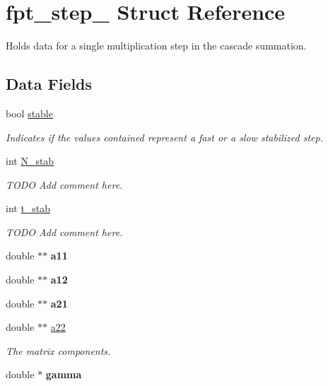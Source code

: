 \hypertarget{structfpt__step__}{
\section{fpt\_\-step\_\- Struct Reference}
\label{structfpt__step__}
}
Holds data for a single multiplication step in the cascade summation.  


\subsection*{Data Fields}
\begin{CompactItemize}
\item 
\hypertarget{structfpt__step___o0}{
bool \hyperlink{structfpt__step___o0}{stable}}
\label{structfpt__step___o0}

\begin{CompactList}\small\item\em Indicates if the values contained represent a fast or a slow stabilized step. \item\end{CompactList}\item 
\hypertarget{structfpt__step___o1}{
int \hyperlink{structfpt__step___o1}{N\_\-stab}}
\label{structfpt__step___o1}

\begin{CompactList}\small\item\em TODO Add comment here. \item\end{CompactList}\item 
\hypertarget{structfpt__step___o2}{
int \hyperlink{structfpt__step___o2}{t\_\-stab}}
\label{structfpt__step___o2}

\begin{CompactList}\small\item\em TODO Add comment here. \item\end{CompactList}\item 
\hypertarget{structfpt__step___o3}{
double $\ast$$\ast$ {\bf a11}}
\label{structfpt__step___o3}

\item 
\hypertarget{structfpt__step___o4}{
double $\ast$$\ast$ {\bf a12}}
\label{structfpt__step___o4}

\item 
\hypertarget{structfpt__step___o5}{
double $\ast$$\ast$ {\bf a21}}
\label{structfpt__step___o5}

\item 
\hypertarget{structfpt__step___o6}{
double $\ast$$\ast$ \hyperlink{structfpt__step___o6}{a22}}
\label{structfpt__step___o6}

\begin{CompactList}\small\item\em The matrix components. \item\end{CompactList}\item 
\hypertarget{structfpt__step___o7}{
double $\ast$ {\bf gamma}}
\label{structfpt__step___o7}

\end{CompactItemize}


